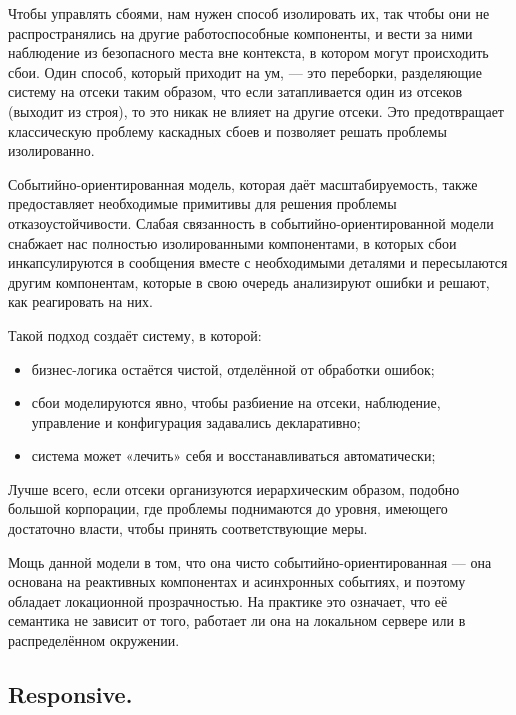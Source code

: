 Чтобы управлять сбоями, нам нужен способ изолировать их, так чтобы они не распространялись на другие работоспособные компоненты, и вести за ними наблюдение из безопасного места вне контекста, в котором могут происходить сбои. Один способ, который приходит на ум, --- это переборки, разделяющие систему на отсеки таким образом, что если затапливается один из отсеков (выходит из строя), то это никак не влияет на другие отсеки. Это предотвращает классическую проблему каскадных сбоев и позволяет решать проблемы изолированно.

Событийно-ориентированная модель, которая даёт масштабируемость, также предоставляет необходимые примитивы для решения проблемы отказоустойчивости. Слабая связанность в событийно-ориентированной модели снабжает нас полностью изолированными компонентами, в которых сбои инкапсулируются в сообщения вместе с необходимыми деталями и пересылаются другим компонентам, которые в свою очередь анализируют ошибки и решают, как реагировать на них.

Такой подход создаёт систему, в которой:

\begin{itemize}
  \item бизнес-логика остаётся чистой, отделённой от обработки ошибок;
  \item сбои моделируются явно, чтобы разбиение на отсеки, наблюдение, управление и конфигурация задавались декларативно;
  \item система может «лечить» себя и восстанавливаться автоматически;
\end{itemize}

Лучше всего, если отсеки организуются иерархическим образом, подобно большой корпорации, где проблемы поднимаются до уровня, имеющего достаточно власти, чтобы принять соответствующие меры.

Мощь данной модели в том, что она чисто событийно-ориентированная --- она основана на реактивных компонентах и асинхронных событиях, и поэтому обладает локационной прозрачностью. На практике это означает, что её семантика не зависит от того, работает ли она на локальном сервере или в распределённом окружении.

\subsection{Responsive. }
\label{subsub:domain:reactive_programming:responsive}

